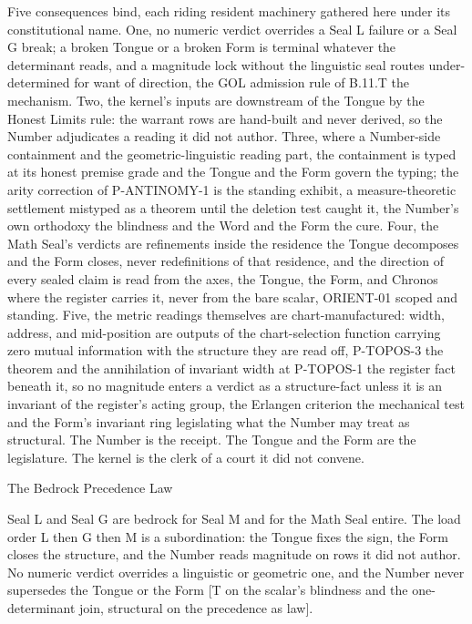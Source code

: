 \documentclass[10pt,twocolumn]{article}
\begin{document}
Five consequences bind, each riding resident machinery gathered here
under its constitutional name. One, no numeric verdict overrides a Seal
L failure or a Seal G break; a broken Tongue or a broken Form is
terminal whatever the determinant reads, and a magnitude lock without
the linguistic seal routes under-determined for want of direction, the
GOL admission rule of B.11.T the mechanism. Two, the kernel's inputs are
downstream of the Tongue by the Honest Limits rule: the warrant rows are
hand-built and never derived, so the Number adjudicates a reading it did
not author. Three, where a Number-side containment and the
geometric-linguistic reading part, the containment is typed at its
honest premise grade and the Tongue and the Form govern the typing; the
arity correction of P-ANTINOMY-1 is the standing exhibit, a
measure-theoretic settlement mistyped as a theorem until the deletion
test caught it, the Number's own orthodoxy the blindness and the Word
and the Form the cure. Four, the Math Seal's verdicts are refinements
inside the residence the Tongue decomposes and the Form closes, never
redefinitions of that residence, and the direction of every sealed claim
is read from the axes, the Tongue, the Form, and Chronos where the
register carries it, never from the bare scalar, ORIENT-01 scoped and
standing. Five, the metric readings themselves are chart-manufactured:
width, address, and mid-position are outputs of the chart-selection
function carrying zero mutual information with the structure they are
read off, P-TOPOS-3 the theorem and the annihilation of invariant width
at P-TOPOS-1 the register fact beneath it, so no magnitude enters a
verdict as a structure-fact unless it is an invariant of the register's
acting group, the Erlangen criterion the mechanical test and the Form's
invariant ring legislating what the Number may treat as structural. The
Number is the receipt. The Tongue and the Form are the legislature. The
kernel is the clerk of a court it did not convene.

\begin{jbox}{The Bedrock Precedence Law}

Seal L and Seal G are bedrock for Seal M and for the Math Seal entire.
The load order L then G then M is a subordination: the Tongue fixes the
sign, the Form closes the structure, and the Number reads magnitude on
rows it did not author. No numeric verdict overrides a linguistic or
geometric one, and the Number never supersedes the Tongue or the Form
{[}T on the scalar's blindness and the one-determinant join, structural
on the precedence as law{]}.

\end{jbox}
\end{document}
